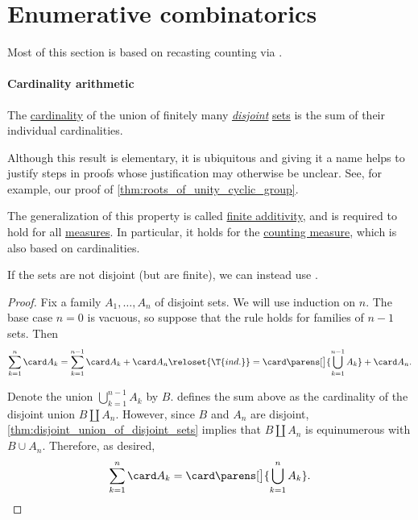 \section{Enumerative combinatorics}\label{sec:enumerative_combinatorics}

Most of this section is based on recasting counting via .

\paragraph{Cardinality arithmetic}

\begin{theorem}\label{thm:cardinality_sum_rule}
  The \hyperref[def:cardinality]{cardinality} of the union of finitely many \emph{\hyperref[def:disjoint_sets]{disjoint}} \hyperref[def:set]{sets} is the sum of their individual cardinalities.
\end{theorem}
\begin{comments}
  \item Although this result is elementary, it is ubiquitous and giving it a name helps to justify steps in proofs whose justification may otherwise be unclear. See, for example, our proof of \cref{thm:roots_of_unity_cyclic_group}.

  \item The generalization of this property is called \hyperref[def:boolean_algebra_additive_function/finite]{finite additivity}, and is required to hold for all \hyperref[def:measure]{measures}. In particular, it holds for the \hyperref[def:counting_measure]{counting measure}, which is also based on cardinalities.

  \item If the sets are not disjoint (but are finite), we can instead use .
\end{comments}
\begin{proof}
  Fix a family \( A_1, \ldots, A_n \) of disjoint sets. We will use induction on \( n \). The base case \( n = 0 \) is vacuous, so suppose that the rule holds for families of \( n - 1 \) sets. Then
  \begin{equation*}
    \sum_{k=1}^n \card A_k
    =
    \sum_{k=1}^{n-1} \card A_k + \card A_n
    \reloset {\T{ind.}} =
    \card\parens[\big]{ \bigcup_{k=1}^{n-1} A_k } + \card A_n.
  \end{equation*}

  Denote the union \( \bigcup_{k=1}^{n-1} A_k \) by \( B \).  defines the sum above as the cardinality of the disjoint union \( B \amalg A_n \). However, since \( B \) and \( A_n \) are disjoint, \cref{thm:disjoint_union_of_disjoint_sets} implies that \( B \amalg A_n \) is equinumerous with \( B \cup A_n \). Therefore, as desired,
  \begin{equation*}
    \sum_{k=1}^n \card A_k = \card\parens[\big]{ \bigcup_{k=1}^n A_k }.
  \end{equation*}
\end{proof}

